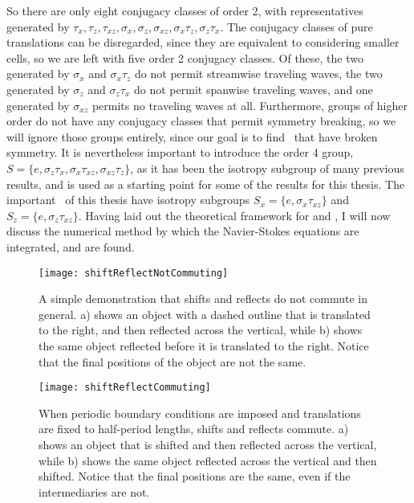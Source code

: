 So there are only eight conjugacy classes of order 2, with representatives generated by $\tau_x,\tau_z,\tau_{xz}, \sigma_x,\sigma_z,\sigma_{xz},\sigma_{x}\tau_z,\sigma_z\tau_x$. The conjugacy classes of pure translations can be disregarded, since they are equivalent to considering smaller cells, so we are left with five order 2 conjugacy classes. Of these, the two  generated by $\sigma_x$ and $\sigma_x\tau_z$ do not permit streamwise traveling waves, the two generated by $\sigma_z$ and $\sigma_z\tau_x$ do not permit spanwise traveling waves, and one generated by  $\sigma_{xz}$ permits no traveling waves at all. Furthermore, groups of higher order do not have any conjugacy classes that permit symmetry breaking, so we will ignore those groups entirely, since our goal is to find \ecs\ that have broken symmetry. It is nevertheless important to introduce the order 4 group, $S = \{ e, \sigma_z\tau_x,\sigma_x\tau_{xz},\sigma_{xz}\tau_z\}$, as it has been the isotropy subgroup of many previous results, and is used as a starting point for some of the results for this thesis. The important \ecs\ of this thesis have isotropy subgroups $S_x = \{ e, \sigma_x\tau_{xz}\}$ and $S_z = \{e, \sigma_z\tau_{xz}\}$. Having laid out the theoretical framework for \pCf and \ecs, I will now discuss the numerical method by which the Navier-Stokes equations are integrated, and \ecs are found.  
\begin{figure}[t!]
\texttt{[image: shiftReflectNotCommuting]}
\caption{A simple demonstration that shifts and reflects do not commute in general. a) shows an object with a dashed outline that is translated to the right, and then reflected across the vertical, while b) shows the same object reflected before it is translated to the right. Notice that the final positions of the object are not the same.}\label{fig:notabelian}
\end{figure}

\begin{figure}[t!]
\texttt{[image: shiftReflectCommuting]}
\caption{When periodic boundary conditions are imposed and translations are fixed to half-period lengths, shifts and reflects commute. a) shows an object that is shifted and then reflected across the vertical, while b) shows the same object reflected across the vertical and then shifted. Notice that the final positions are the same, even if the intermediaries are not.}\label{fig:abelian}
\end{figure}
  
